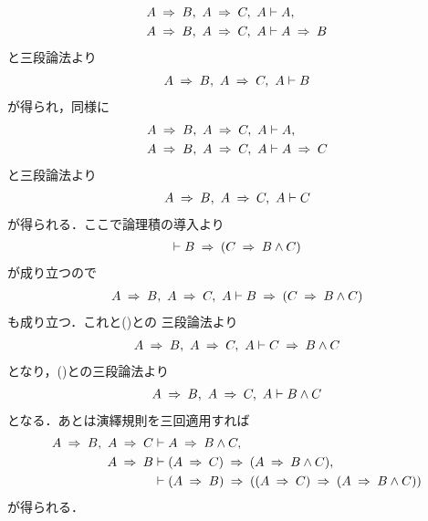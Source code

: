 	\begin{prf}
		\begin{align}
			A \rarrow B,\ A \rarrow C,\ A &\vdash A, \\
			A \rarrow B,\ A \rarrow C,\ A &\vdash A \rarrow B
		\end{align}
		と三段論法より
		\begin{align}
			A \rarrow B,\ A \rarrow C,\ A \vdash B
			\label{fom:logicalthm_conjunction_of_consequences_1}
		\end{align}
		が得られ，同様に
		\begin{align}
			A \rarrow B,\ A \rarrow C,\ A &\vdash A, \\
			A \rarrow B,\ A \rarrow C,\ A &\vdash A \rarrow C
		\end{align}
		と三段論法より
		\begin{align}
			A \rarrow B,\ A \rarrow C,\ A \vdash C
			\label{fom:logicalthm_conjunction_of_consequences_2}
		\end{align}
		が得られる．ここで論理積の導入より
		\begin{align}
			\vdash B \rarrow (C \rarrow B \wedge C)
		\end{align}
		が成り立つので
		\begin{align}
			A \rarrow B,\ A \rarrow C,\ A \vdash B \rarrow (C \rarrow B \wedge C)
		\end{align}
		も成り立つ．これと()との
		三段論法より
		\begin{align}
			A \rarrow B,\ A \rarrow C,\ A \vdash C \rarrow B \wedge C
		\end{align}
		となり，()との三段論法より
		\begin{align}
			A \rarrow B,\ A \rarrow C,\ A \vdash B \wedge C
		\end{align}
		となる．あとは演繹規則を三回適用すれば
		\begin{align}
			A \rarrow B,\ A \rarrow C &\vdash A \rarrow B \wedge C, \\
			A \rarrow B &\vdash (A \rarrow C) \rarrow (A \rarrow B \wedge C), \\
			&\vdash (A \rarrow B) \rarrow ((A \rarrow C) \rarrow (A \rarrow B \wedge C))
		\end{align}
		が得られる．
		\QED
	\end{prf}
	

